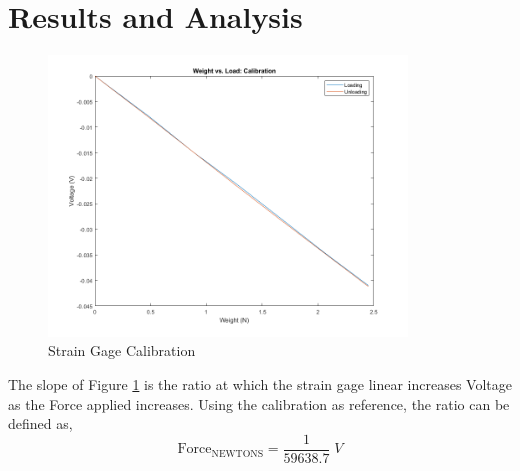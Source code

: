 \documentclass{article}
\begin{document}
\section{Results and Analysis}

\begin{figure}[H]
  \centering
  \includegraphics[width = 0.85\textwidth]{finalprojectimages/StrainGageCalibration.png}
  \caption{Strain Gage Calibration}
  \label{fig:strain gage}
\end{figure}


The slope of Figure \ref{fig:strain gage} is the ratio at which the strain gage linear increases Voltage as the Force applied increases.  Using the calibration as reference, the ratio can be defined as,
\begin{equation*}
   \text{Force}_{\text{NEWTONS}} = \frac{1}{59638.7}\; V
\end{equation*}
\end{document}
